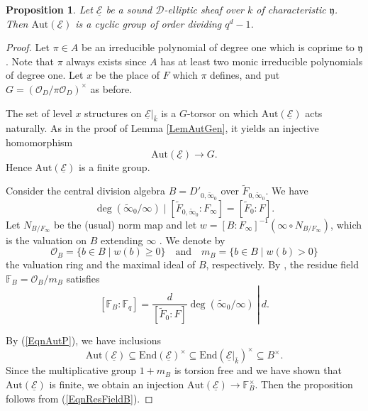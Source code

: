 \documentclass[10pt]{amsart}
\theoremstyle{plain}
\newtheorem{prop}[thm]{Proposition}
\theoremstyle{definition}
\newcommand{\Aut}{\mathrm{Aut}}
\newcommand{\End}{\mathrm{End}}
\newcommand{\cO}{\mathcal{O}}
\newcommand{\ucE}{\underline{\mathcal{E}}}
\newcommand{\bF}{\mathbb{F}}
\newcommand{\sD}{\mathscr{D}}
\newcommand{\fry}{\mathfrak{y}}
\begin{document}
\begin{prop}\label{PropAutFinite}
	Let $\ucE$ be a sound $\sD$-elliptic sheaf over $k$ of characteristic $\fry$. Then $\Aut(\ucE)$ is a cyclic group of order dividing $q^d-1$.
\end{prop}
\begin{proof}
	Let $\pi\in A$ be an irreducible polynomial of degree one which is coprime to $\fry$. 
	Note that $\pi$ always exists since $A$ has at least two monic irreducible polynomials of degree one.
	Let $x$ be the place of $F$ which $\pi$ defines, and put $G=(\cO_D/\pi\cO_D)^\times$ as before.
	
	The set of level $x$ structures on $\ucE|_{\bar{k}}$ is a $G$-torsor on which $\Aut(\ucE)$ acts naturally.
	As in the proof of Lemma \ref{LemAutGen}, it yields an injective homomorphism
	\[
	\Aut(\ucE)\to G.
	\]
	Hence $\Aut(\ucE)$ is a finite group. 
	
	Consider the central division algebra $B=D'_{0,\tilde{\infty}_0}$ over $\tilde{F}_{0,\tilde{\infty}_0}$. We have 
	\[
	\deg(\tilde{\infty}_0/\infty)\mid [\tilde{F}_{0,\tilde{\infty}_0}:F_\infty]=[\tilde{F}_0:F].
	\]
	Let $N_{B/F_\infty}$ be the (usual) norm map and let $w=[B:F_\infty]^{-1}(\infty\circ N_{B/F_\infty})$, 
	which is the valuation on $B$ extending $\infty$ \cite[Theorem 12.10]{Rei}. We denote by
	\[
	\cO_B=\{b\in B\mid w(b)\geq 0\}\quad\text{and}\quad m_B=\{b\in B\mid w(b)>0\} 
	\]
	the valuation ring and the maximal ideal of $B$, respectively. By \cite[Theorem 14.3]{Rei}, the residue field $\bF_B=\cO_B/m_B$ satisfies
	\begin{equation}\label{EqnResFieldB}
	[\bF_B:\bF_q]=\left.\frac{d}{[\tilde{F}_0:F]}\deg(\tilde{\infty}_0/\infty)\ \right |\ d.
	\end{equation}
	
	By (\ref{EqnAutP}), we have inclusions
	\[
	\Aut(\ucE)\subseteq \End(\ucE)^\times \subseteq\End(\ucE|_{\bar{k}})^\times \subseteq B^\times.
	\]
	Since the multiplicative group $1+m_B$ is torsion free and we have shown that $\Aut(\ucE)$ is finite, 
	we obtain an injection $\Aut(\ucE)\to \bF_B^\times$. Then the proposition follows from (\ref{EqnResFieldB}).

\end{proof}
\end{document}
